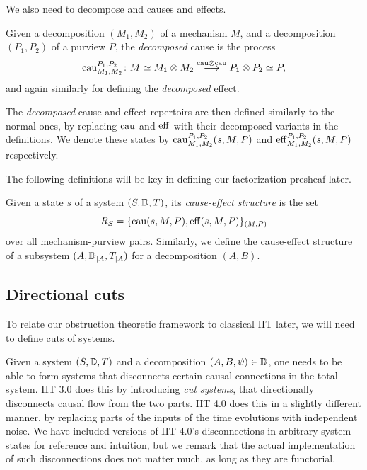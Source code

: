 We also need to decompose and causes and effects.  

\begin{definition}
    Given a decomposition $(M_1, M_2)$ of a mechanism $M$, and a decomposition $(P_1, P_2)$ of a purview $P$, the \emph{decomposed} cause is the process 
    $$\mathrm{cau}_{M_1, M_2}^{P_1, P_2} \colon M \simeq M_1\otimes M_2 \overset{\mathrm{cau}\otimes \mathrm{cau}}{\longrightarrow} P_1\otimes P_2 \simeq P,$$
    and again similarly for defining the \emph{decomposed} effect.
\end{definition}

The \emph{decomposed} cause and effect repertoirs are then defined similarly to the normal ones, by replacing $\mathrm{cau}$ and $\mathrm{eff}$ with their decomposed variants in the definitions. We denote these states by $\mathrm{cau}_{M_1, M_2}^{P_1, P_2}(s,M,P)$ and $\mathrm{eff}_{M_1, M_2}^{P_1, P_2}(s,M,P)$ respectively. 

The following definitions will be key in defining our factorization presheaf later. 

\begin{definition}
    Given a state $s$ of a system $(S, \mathbb{D}, T)$, its \emph{cause-effect structure} is the set
    \[R_S = \{\mathrm{cau}(s,M,P), \mathrm{eff}(s,M,P)\}_{(M,P)}\]
    over all mechanism-purview pairs. Similarly, we define the cause-effect structure of a subsystem $(A,\mathbb{D}_{\mid A}, T_{\mid A})$ for a decomposition $(A,B)$. 
\end{definition}


\subsection{Directional cuts}

To relate our obstruction theoretic framework to classical IIT later, we will need to define cuts of systems. 

Given a system $(S, \mathbb{D}, T)$ and a decomposition $(A, B, \psi) \in \mathbb{D}$, one needs to be able to form systems that disconnects certain causal connections in the total system. IIT 3.0 \citeme does this by introducing \emph{cut systems}, that directionally disconnects causal flow from the two parts. IIT 4.0 \citeme does this in a slightly different manner, by replacing parts of the inputs of the time evolutions with independent noise. We have included versions of IIT 4.0's disconnections in arbitrary system states for reference and intuition, but we remark that the actual implementation of such disconnections does not matter much, as long as they are functorial. 

